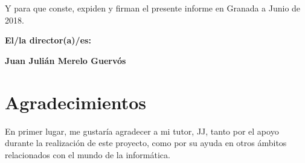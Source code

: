 \vspace{0.5cm}

Y para que conste, expiden y firman el presente informe en Granada a Junio de 2018.

\vspace{1cm}

\textbf{El/la director(a)/es: }

\vspace{5cm}

\noindent \textbf{Juan Julián Merelo Guervós}

\chapter*{Agradecimientos}

En primer lugar, me gustaría agradecer a mi tutor, JJ, tanto por el apoyo durante la realización
de este proyecto, como por su ayuda en otros ámbitos relacionados con el mundo de la informática.
\\\\


